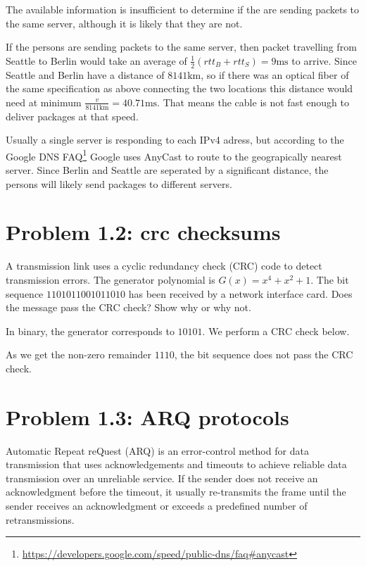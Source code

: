 \documentclass[a4paper,10pt]{article}
\begin{document}
The available information is insufficient to determine if the are sending packets to the same server, although it is likely that they are not.

If the persons are sending packets to the same server, then packet travelling from Seattle to Berlin would take an average of $\frac{1}{2}(rtt_{B} + rtt_{S}) = 9 \mathrm{ms}$ to arrive. Since Seattle and Berlin have a distance of $8141 \mathrm{km}$, so if there was an optical fiber of the same specification as above connecting the two locations this distance would need at minimum $\frac{v}{8141 \mathrm{km}} = 40.71 \mathrm{ms}$. That means the cable is not fast enough to deliver packages at that speed.

Usually a single server is responding to each IPv4 adress, but according to the Google DNS FAQ\footnote{\url{https://developers.google.com/speed/public-dns/faq\#anycast}} Google uses AnyCast to route to the geograpically nearest server. Since Berlin and Seattle are seperated by a significant distance, the persons will likely send packages to different servers.

\section{Problem 1.2: crc checksums}

A transmission link uses a cyclic redundancy check (CRC) code to detect transmission errors. The generator polynomial is $G(x) = x^4 + x^2 + 1$. The bit sequence $1101 0110 0101 1010$ has been received by a network interface card. Does the message pass the CRC check? Show why or why not.

In binary, the generator corresponds to $10101$. We perform a CRC check below.

\noindent As we get the non-zero remainder $1110$, the bit sequence does not pass the CRC check.

\section{Problem 1.3: ARQ protocols}

Automatic Repeat reQuest (ARQ) is an error-control method for data transmission that uses acknowledgements and timeouts to achieve reliable data transmission over an unreliable service. If the sender does not receive an acknowledgment before the timeout, it usually re-transmits the frame until the sender receives an acknowledgment or exceeds a predefined number of retransmissions.
\end{document}
